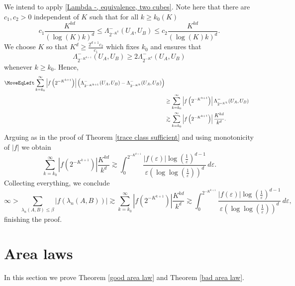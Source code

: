 \documentclass[12pt]{amsart}
\numberwithin{equation}{section}
\newcommand{\eps}{\varepsilon}
\begin{document}
We intend to apply \eqref{Lambda -, equivalence, two cubes}. Note here that there are $c_1, c_2>0$ independent of $K$ such that for all $k \geq k_0(K)$
$$c_1\frac{K^{kd}}{(\log(K)k)^d}\le \Lambda^-_{2^{-K^{k}}}(U_A, U_B) \le c_2 \frac{K^{kd}}{(\log(K)k)^d}.$$
We choose $K$ so that $K^d \ge \frac{2^{d+1}c_2}{c_1}$ which fixes $k_0$ and ensures that 
\[
\Lambda^-_{2^{-K^{k+1}}}(U_A, U_B) \ge 2\Lambda^-_{2^{-K^{k}}}(U_A, U_B)
\]
whenever $k\geq k_0$. Hence, 
\begin{align*}
\MoveEqLeft \sum_{k=k_0}^\infty \left|f\left(2^{-K^{k+1}}\right)\right| \left( \Lambda^-_{2^{-K^{k+1}}}(U_A, U_B) - \Lambda^-_{2^{-K^{k}}}(U_A, U_B)\right) \\
&\geq  \sum_{k=k_0}^\infty \left|f\left(2^{-K^{k+1}}\right)\right| \Lambda^-_{2^{-K^{k}}}(U_A, U_B)\\
&\gtrsim \sum_{k=k_0}^\infty \left|f\left(2^{-K^{k+1}}\right)\right|   \frac{K^{kd}}{k^d}.
\end{align*}
Arguing as in the proof of Theorem \ref{trace class sufficient} and using monotonicity of $|f|$ we obtain
$$\sum_{k=k_0}^\infty \left|f\left(2^{-K^{k+1}}\right)\right|   \frac{K^{kd}}{k^d} \gtrsim\int_0^{2^{-K^{k+1}}}\frac{|f(\eps)| \log\left(\frac{1}{\eps}\right)^{d-1}}{\eps\left(\log\log\left(\frac{1}{\eps}\right)\right)^d} \, d\eps.$$
Collecting everything, we conclude
\[
\infty > \sum_{\lambda_n(A,B)\leq \beta}|f(\lambda_n(A,B))| \gtrsim \sum_{k=k_0}^\infty \left|f\left(2^{-K^{k+1}}\right)\right|   \frac{K^{kd}}{k^d} \gtrsim\int_0^{2^{-K^{k+1}}}\frac{|f(\eps)| \log\left(\frac{1}{\eps}\right)^{d-1}}{\eps\left(\log\log\left(\frac{1}{\eps}\right)\right)^d} \, d\eps,
\]
finishing the proof.

\section{Area laws}
In this section we prove Theorem \ref{good area law} and Theorem \ref{bad area law}.
\end{document}
